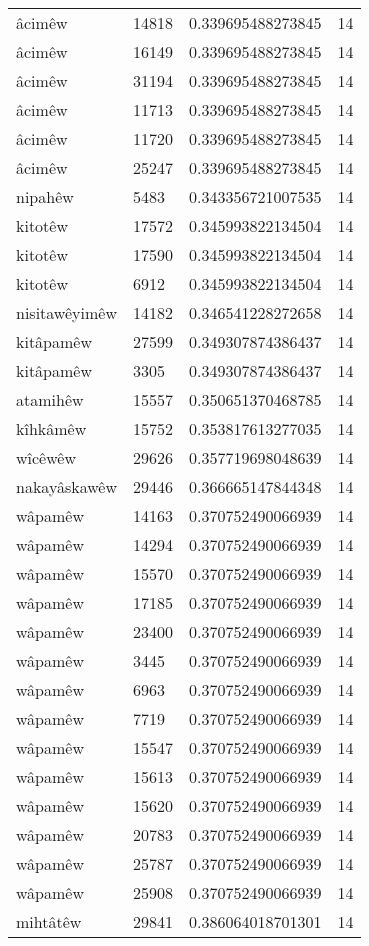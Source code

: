 \begin{longtable}{llll}
âcimêw & 14818 & 0.339695488273845 & 14\\
âcimêw & 16149 & 0.339695488273845 & 14\\
âcimêw & 31194 & 0.339695488273845 & 14\\
âcimêw & 11713 & 0.339695488273845 & 14\\
âcimêw & 11720 & 0.339695488273845 & 14\\
âcimêw & 25247 & 0.339695488273845 & 14\\
nipahêw & 5483 & 0.343356721007535 & 14\\
kitotêw & 17572 & 0.345993822134504 & 14\\
kitotêw & 17590 & 0.345993822134504 & 14\\
kitotêw & 6912 & 0.345993822134504 & 14\\
nisitawêyimêw & 14182 & 0.346541228272658 & 14\\
kitâpamêw & 27599 & 0.349307874386437 & 14\\
kitâpamêw & 3305 & 0.349307874386437 & 14\\
atamihêw & 15557 & 0.350651370468785 & 14\\
kîhkâmêw & 15752 & 0.353817613277035 & 14\\
wîcêwêw & 29626 & 0.357719698048639 & 14\\
nakayâskawêw & 29446 & 0.366665147844348 & 14\\
wâpamêw & 14163 & 0.370752490066939 & 14\\
wâpamêw & 14294 & 0.370752490066939 & 14\\
wâpamêw & 15570 & 0.370752490066939 & 14\\
wâpamêw & 17185 & 0.370752490066939 & 14\\
wâpamêw & 23400 & 0.370752490066939 & 14\\
wâpamêw & 3445 & 0.370752490066939 & 14\\
wâpamêw & 6963 & 0.370752490066939 & 14\\
wâpamêw & 7719 & 0.370752490066939 & 14\\
wâpamêw & 15547 & 0.370752490066939 & 14\\
wâpamêw & 15613 & 0.370752490066939 & 14\\
wâpamêw & 15620 & 0.370752490066939 & 14\\
wâpamêw & 20783 & 0.370752490066939 & 14\\
wâpamêw & 25787 & 0.370752490066939 & 14\\
wâpamêw & 25908 & 0.370752490066939 & 14\\
mihtâtêw & 29841 & 0.386064018701301 & 14\\

\end{longtable}
